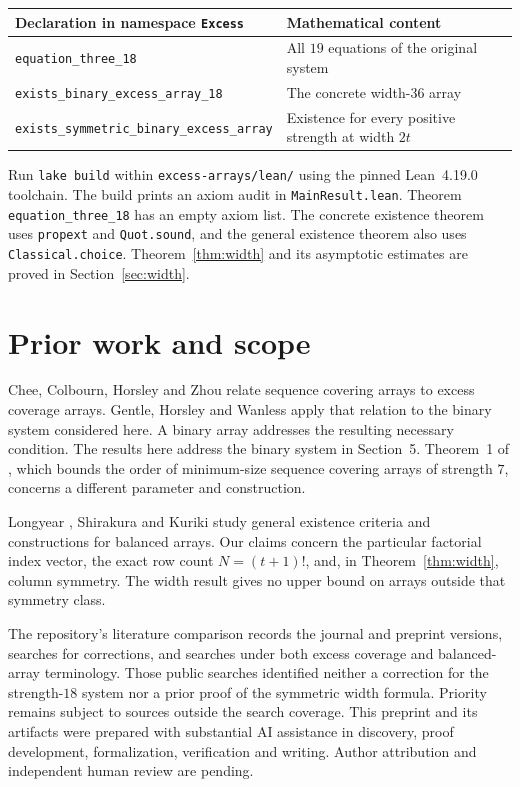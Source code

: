 \documentclass[11pt]{article}
\newcommand{\code}[1]{\texttt{#1}}
\begin{document}
\begin{center}
\begin{tabular}{@{}p{.58\linewidth}p{.37\linewidth}@{}}
\toprule
Declaration in namespace \code{Excess} & Mathematical content\\
\midrule
\code{equation\_three\_18} & All \(19\) equations of the original system\\
\code{exists\_binary\_excess\_array\_18} & The concrete width-\(36\) array\\
\code{exists\_symmetric\_binary\_excess\_array} & Existence for every positive strength at width \(2t\)\\
\bottomrule
\end{tabular}
\end{center}

Run \code{lake build} within \code{excess-arrays/lean/} using the pinned
Lean~4.19.0 toolchain. The build prints an axiom audit in
\code{MainResult.lean}. Theorem \code{equation\_three\_18} has an empty
axiom list. The concrete existence theorem uses \code{propext}
and \code{Quot.sound}, and the general existence theorem also uses
\code{Classical.choice}. Theorem~\ref{thm:width} and its asymptotic
estimates are proved in Section~\ref{sec:width}.

\section{Prior work and scope}
Chee, Colbourn, Horsley and Zhou \cite{chee} relate
sequence covering arrays to excess coverage arrays. Gentle, Horsley
and Wanless \cite[Section~5]{ghw} apply that relation to the binary
system considered here. A binary array addresses the resulting
necessary condition. The results here address the binary system in
Section~5. Theorem~1 of \cite{ghw}, which bounds the order of
minimum-size sequence covering arrays of strength \(7\), concerns a
different parameter and construction.

Longyear \cite{longyear}, Shirakura \cite{shirakura} and Kuriki
\cite{kuriki} study general existence criteria and constructions for
balanced arrays. Our claims concern the particular factorial index
vector, the exact row count \(N=(t+1)!\), and, in
Theorem~\ref{thm:width}, column symmetry. The width result gives no
upper bound on arrays outside that symmetry class.

The repository's literature comparison records the journal and
preprint versions, searches for corrections, and searches under both
excess coverage and balanced-array terminology. Those public searches
identified neither a correction for the strength-\(18\) system nor a
prior proof of the symmetric width formula. Priority remains subject
to sources outside the search coverage. This preprint and its
artifacts were prepared with substantial AI assistance in
discovery, proof development, formalization, verification and
writing. Author attribution and independent human review are pending.
\end{document}
